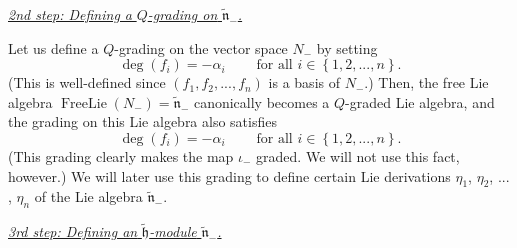 \documentclass[etingof-lie.tex]{subfiles}
\begin{document}
\bigskip

\underline{\textit{2nd step: Defining a }$Q$\textit{-grading on }%
$\widetilde{\mathfrak{n}}_{-}$\textit{.}}

Let us define a $Q$-grading on the vector space $N_{-}$ by setting%
\[
\deg\left(  f_{i}\right)  =-\alpha_{i}\ \ \ \ \ \ \ \ \ \ \text{for all }%
i\in\left\{  1,2,...,n\right\}  .
\]
(This is well-defined since $\left(  f_{1},f_{2},...,f_{n}\right)  $ is a
basis of $N_{-}$.) Then, the free Lie algebra $\operatorname*{FreeLie}\left(
N_{-}\right)  =\widetilde{\mathfrak{n}}_{-}$ canonically becomes a $Q$-graded
Lie algebra, and the grading on this Lie algebra also satisfies%
\[
\deg\left(  f_{i}\right)  =-\alpha_{i}\ \ \ \ \ \ \ \ \ \ \text{for all }%
i\in\left\{  1,2,...,n\right\}  .
\]
(This grading clearly makes the map $\iota_{-}$ graded. We will not use this
fact, however.) We will later use this grading to define certain Lie
derivations $\eta_{1}$, $\eta_{2}$, $...$, $\eta_{n}$ of the Lie algebra
$\widetilde{\mathfrak{n}}_{-}$.

\bigskip

\underline{\textit{3rd step: Defining an }$\widetilde{\mathfrak{h}}%
$\textit{-module }$\widetilde{\mathfrak{n}}_{-}$\textit{.}}
\end{document}
